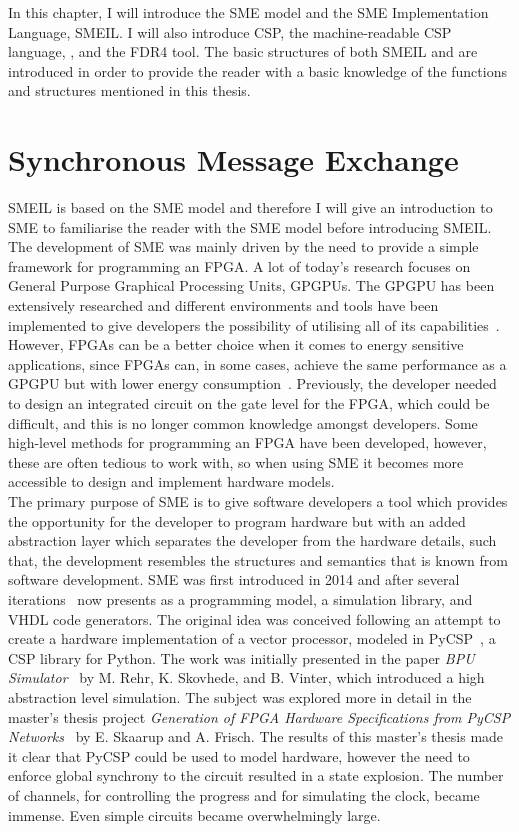 In this chapter, I will introduce the SME model and the SME Implementation Language, SMEIL. I will also introduce CSP, the machine-readable CSP language, \cspm{}, and the FDR4 tool. The basic structures of both SMEIL and \cspm{} are introduced in order to provide the reader with a basic knowledge of the functions and structures mentioned in this thesis.
\section{Synchronous Message Exchange}
SMEIL is based on the SME model and therefore I will give an introduction to SME to familiarise the reader with the SME model before introducing SMEIL.
\\

The development of SME was mainly driven by the need to provide a simple framework for programming an FPGA. A lot of today's research focuses on General Purpose Graphical Processing Units, GPGPUs.
The GPGPU has been extensively researched and different environments and tools have been implemented to give developers the possibility of utilising all of its capabilities~\cite{Vinter2014}.
However, FPGAs can be a better choice when it comes to energy sensitive applications, since FPGAs can, in some cases, achieve the same performance as a GPGPU but with lower energy consumption~\cite{Vinter2014}.
Previously, the developer needed to design an integrated circuit on the gate level for the FPGA, which could be difficult, and this is no longer common knowledge amongst developers. Some high-level methods for programming an FPGA have been developed, however, these are often tedious to work with, so when using SME it becomes more accessible to design and implement hardware models.\\

The primary purpose of SME is to give software developers a tool which provides the opportunity for the developer to program hardware but with an added abstraction layer which separates the developer from the hardware details, such that, the development resembles the structures and semantics that is known from software development.
SME was first introduced in 2014 and after several iterations~\cite{Vinter2014, Vinter2015, Skovhede} now presents as a programming model, a simulation library, and VHDL code generators. The original idea was conceived following an attempt to create a hardware implementation of a vector processor, modeled in PyCSP~\cite{vinter2009pycsp}, a CSP library for Python. The work was initially presented in the paper \textit{BPU Simulator}~\cite{Rehr2013} by M. Rehr, K. Skovhede, and B. Vinter, which introduced a high abstraction level simulation. The subject was explored more in detail in the master's thesis project \textit{Generation of FPGA Hardware
Specifications from PyCSP Networks}~\cite{Skaarup14} by E. Skaarup and A. Frisch. The results of this master's thesis made it clear that PyCSP could be used to model hardware, however the need to enforce global synchrony to the circuit resulted in a state explosion. The number of channels, for controlling the progress and for simulating the clock, became immense. Even simple circuits became overwhelmingly large.\\

